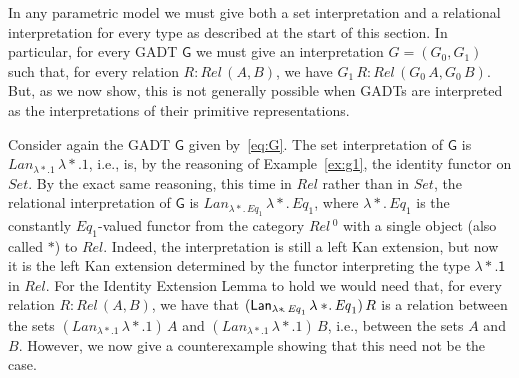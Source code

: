 \documentclass[acmsmall,screen,review,anonymous]{acmart}
\theoremstyle{definition}
\begin{document}
\begin{example}\label{ex:prim-par}
In any parametric model we must give both a set interpretation and a
relational interpretation for every type as described at the start of
this section. In particular, for every GADT $\mathsf{G}$ we must give
an interpretation $G = (G_0,G_1)$ such that, for every relation $R :
\mathit{Rel}\,(A, B)$, we have $G_1\,R : \mathit{Rel}\,(G_0\,A,
G_0\,B)$. But, as we now show, this is not generally possible when
GADTs are interpreted as the interpretations of their primitive
representations.

Consider again the GADT $\mathsf{G}$ given by~\eqref{eq:G}. The set
interpretation of $\mathsf{G}$ is $\mathit{Lan}_{\lambda
  *\!. 1}\,\lambda *\!. 1$, i.e., is, by the reasoning of
Example~\ref{ex:g1}, the identity functor on $\mathit{Set}$. By the
exact same reasoning, this time in $\mathit{Rel}$ rather than in
$\mathit{Set}$, the relational interpretation of $\mathsf{G}$ is
$\mathit{Lan}_{\lambda *\!.\,\mathit{Eq}_1} \,\lambda
*\!.\,\mathit{Eq}_1$, where $\lambda *\!.\,\mathit{Eq}_1$ is the
constantly $\mathit{Eq}_1$-valued functor from the category
$\mathit{Rel}\,^0$ with a single object (also called $*$) to
$\mathit{Rel}$.  Indeed, the interpretation is still a left Kan
extension, but now it is the left Kan extension determined by the
functor interpreting the type $\mathsf{\lambda *\!. 1}$ in
$\mathit{Rel}$. For the Identity Extension Lemma to hold we would need
that, for every relation $R : \mathit{Rel}\,(A, B)$, we have that
$(\mathit{\mathsf{Lan}}_{\lambda *\!.\,\mathit{Eq}_1} \,\lambda
*\!.\,\mathit{Eq}_1)\, R$ is a relation between the sets
$(\mathit{Lan}_{\lambda *. 1}\,\lambda *\!. 1)\, A$ and
$(\mathit{Lan}_{\lambda *. 1}\,\lambda *\!. 1)\,B$, i.e., between the
sets $A$ and $B$. However, we now give a counterexample showing that
this need not be the case.


\end{example}
\end{document}
